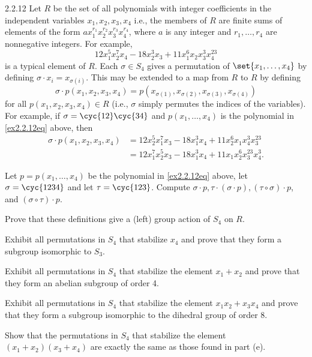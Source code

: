 \begin{exercise}{2.2.12}
    Let $R$ be the set of all polynomials with integer coefficients in the independent variables $x_1, x_2, x_3, x_4$ i.e., the members of $R$ are finite sums of elements of the form $ax_1^{r_1}x_2^{r_2}x_3^{r_3}x_4^{r_4}$, where $a$ is any integer and $r_1, \ldots, r_4$ are nonnegative integers.
	For example,
    \begin{equation}
        \label{ex2.2.12eq}
        \tag{$\ast$}
        12x_1^5x_2^7x_4 - 18x_2^3x_3 + 11x_1^6x_2x_3^3x_4^{23}
    \end{equation}
    is a typical element of $R$.
	Each $\sigma \in S_4$ gives a permutation of $\set{x_1, \ldots, x_4}$ by defining $\sigma \cdot x_i = x_{\sigma(i)}$.
	This may be extended to a map from $R$ to $R$ by defining
    \[
    	\sigma \cdot p(x_1, x_2, x_3, x_4) = p(x_{\sigma(1)}, x_{\sigma(2)}, x_{\sigma(3)}, x_{\sigma(4)})
    \]
    for all $p(x_1, x_2, x_3, x_4) \in R$ (i.e., $\sigma$ simply permutes the indices of the variables).
    For example, if $\sigma = \cyc{1 2}\cyc{3 4}$ and $p(x_1, \ldots, x_4)$ is the polynomial in \eqref{ex2.2.12eq} above, then
    \begin{align*}
        \sigma \cdot p(x_1, x_2, x_3, x_4) &= 12x_2^5x_1^7x_3 - 18x_1^3x_4 + 11x_2^6x_1x_4^3x_3^{23} \\
        &= 12x_1^7x_2^5x_3 - 18x_1^3x_4 + 11x_1x_2^6x_3^{23}x_4^3.
    \end{align*}
    \begin{subexercises}
        \item Let $p = p(x_1, \ldots, x_4)$ be the polynomial in \eqref{ex2.2.12eq} above, let $\sigma = \cyc{1 2 3 4}$ and let $\tau = \cyc{1 2 3}$.
	    Compute $\sigma \cdot p, \tau \cdot (\sigma \cdot p), (\tau \circ \sigma) \cdot p$, and $(\sigma \circ \tau) \cdot p$.
        \item Prove that these definitions give a (left) group action of $S_4$ on $R$.
        \item Exhibit all permutations in $S_4$ that stabilize $x_4$ and prove that they form a subgroup isomorphic to $S_3$.
        \item Exhibit all permutations in $S_4$ that stabilize the element $x_1 + x_2$ and prove that they form an abelian subgroup of order 4.
        \item Exhibit all permutations in $S_4$ that stabilize the element $x_1x_2 + x_3x_4$ and prove that they form a subgroup isomorphic to the dihedral group of order 8.
        \item Show that the permutations in $S_4$ that stabilize the element $(x_1 + x_2)(x_3 + x_4)$ are exactly the same as those found in part (e).
    \end{subexercises}
\end{exercise}


